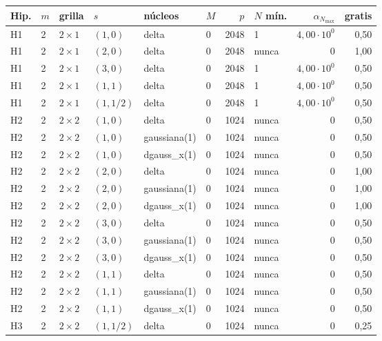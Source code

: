 \begin{tabular}{llllllrlrr}
\toprule
Hip. & $m$ & grilla & $s$ & núcleos & $M$ & $p$ & $N$ mín. & $\alpha_{N_{\max}}$ & gratis \\
\midrule
H1 & 2 & $2\times1$ & $(1, 0)$ & delta & 0 & 2048 & 1 & $4{,}00 \cdot 10^{0}$ & 0,50 \\
H1 & 2 & $2\times1$ & $(2, 0)$ & delta & 0 & 2048 & nunca & $0$ & 1,00 \\
H1 & 2 & $2\times1$ & $(3, 0)$ & delta & 0 & 2048 & 1 & $4{,}00 \cdot 10^{0}$ & 0,50 \\
H1 & 2 & $2\times1$ & $(1, 1)$ & delta & 0 & 2048 & 1 & $4{,}00 \cdot 10^{0}$ & 0,50 \\
H1 & 2 & $2\times1$ & $(1, 1/2)$ & delta & 0 & 2048 & 1 & $4{,}00 \cdot 10^{0}$ & 0,50 \\
H2 & 2 & $2\times2$ & $(1, 0)$ & delta & 0 & 1024 & nunca & $0$ & 0,50 \\
H2 & 2 & $2\times2$ & $(1, 0)$ & gaussiana(1) & 0 & 1024 & nunca & $0$ & 0,50 \\
H2 & 2 & $2\times2$ & $(1, 0)$ & dgauss\_x(1) & 0 & 1024 & nunca & $0$ & 0,50 \\
H2 & 2 & $2\times2$ & $(2, 0)$ & delta & 0 & 1024 & nunca & $0$ & 1,00 \\
H2 & 2 & $2\times2$ & $(2, 0)$ & gaussiana(1) & 0 & 1024 & nunca & $0$ & 1,00 \\
H2 & 2 & $2\times2$ & $(2, 0)$ & dgauss\_x(1) & 0 & 1024 & nunca & $0$ & 1,00 \\
H2 & 2 & $2\times2$ & $(3, 0)$ & delta & 0 & 1024 & nunca & $0$ & 0,50 \\
H2 & 2 & $2\times2$ & $(3, 0)$ & gaussiana(1) & 0 & 1024 & nunca & $0$ & 0,50 \\
H2 & 2 & $2\times2$ & $(3, 0)$ & dgauss\_x(1) & 0 & 1024 & nunca & $0$ & 0,50 \\
H2 & 2 & $2\times2$ & $(1, 1)$ & delta & 0 & 1024 & nunca & $0$ & 0,50 \\
H2 & 2 & $2\times2$ & $(1, 1)$ & gaussiana(1) & 0 & 1024 & nunca & $0$ & 0,50 \\
H2 & 2 & $2\times2$ & $(1, 1)$ & dgauss\_x(1) & 0 & 1024 & nunca & $0$ & 0,50 \\
H3 & 2 & $2\times2$ & $(1, 1/2)$ & delta & 0 & 1024 & nunca & $0$ & 0,25 \\

\end{tabular}
